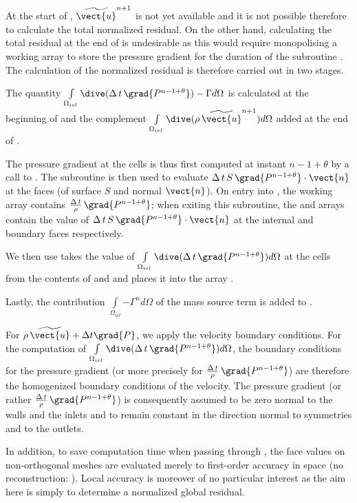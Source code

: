 At the start of , $\widetilde{\vect{u}}^{n+1}$ is not yet available and it is not possible therefore to calculate the total normalized residual. On the other hand, calculating the total residual at the end of  is undesirable as this would require monopolising a working array to store the pressure gradient for the duration of the subroutine .
The calculation of the normalized residual is therefore carried out in two stages.

The quantity $\int\limits_{\Omega_{iel}}{\dive(\Delta\,t\,\grad{P^{n-1+\theta}}) -\Gamma d\Omega}$ is calculated at the beginning of  and the complement $\int\limits_{\Omega_{iel}}{\dive(\rho\,\widetilde{\vect{u}}^{n+1})d\Omega}$ added at the end of .

The pressure gradient at the cells is thus first computed at instant $n-1+\theta$ by a call to . The subroutine  is then used to evaluate $\Delta\,t\,S\,\grad{P^{n-1+\theta}}\cdot\vect{n}$ at the faces (of surface $S$ and normal $\vect{n}$). On entry into , the working array  contains $\frac{\Delta\,t}{\rho}\,\grad{P^{n-1+\theta}}$; when exiting this subroutine, the  and  arrays contain the value of $\Delta\,t\,S\,\grad{P^{n-1+\theta}}\cdot\vect{n}$ at the internal and boundary faces respectively.

We then use  takes the value of $\int\limits_{\Omega_{iel}}{\dive(\Delta\,t\,\grad{P^{n-1+\theta}}) d\Omega}$ at the cells from the contents of  and  and places it into the array .

Lastly, the contribution $\int\limits_{\Omega_{iel}}{ -\Gamma^{n} d\Omega}$ of the mass source term is added to .

For $\rho\,\widetilde{\vect{u}} + \Delta t \grad{P}$, we apply the velocity boundary conditions. For the computation of
$\int\limits_{\Omega_{iel}}{\dive(\Delta\,t\,\grad{P^{n-1+\theta}}) d\Omega}$, the boundary conditions for the pressure gradient (or more precisely for $\frac{\Delta\,t}{\rho}\,\grad{P^{n-1+\theta}}$) are therefore the homogenized boundary conditions of the velocity. The pressure gradient (or rather $\frac{\Delta\,t}{\rho}\,\grad{P^{n-1+\theta}}$) is consequently assumed to be zero normal to the walls and the inlets and to remain constant in the direction normal to symmetries and to the outlets.

In addition, to save computation time when passing through , the face values on non-orthogonal meshes are evaluated merely to first-order accuracy in space (no reconstruction: ). Local accuracy is moreover of no particular interest as the aim here is simply to determine a normalized global residual.

